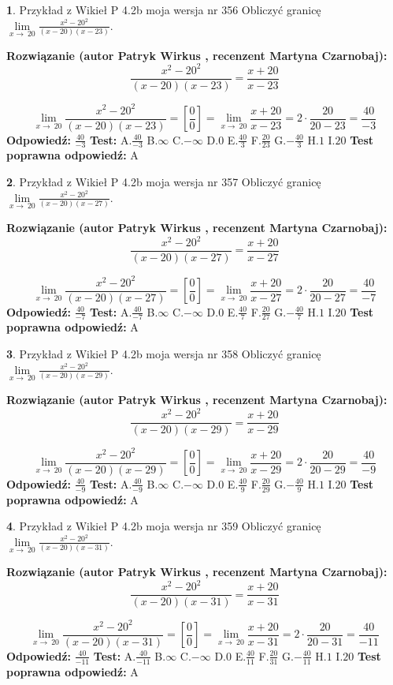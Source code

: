 \documentclass[12pt, a4paper]{article}
\theoremstyle{definition} %
\newtheorem{zad}{}
\newcommand{\zadStart}[1]{\begin{zad}#1\newline}
\newcommand{\zadStop}{\end{zad}}
\newcommand{\rozwStart}[2]{\noindent \textbf{Rozwiązanie (autor #1 , recenzent #2): }\newline}
\newcommand{\rozwStop}{\newline}
\newcommand{\odpStart}{\noindent \textbf{Odpowiedź:}\newline}
\newcommand{\odpStop}{\newline}
\newcommand{\testStart}{\noindent \textbf{Test:}\newline}
\newcommand{\testStop}{\newline}
\newcommand{\kluczStart}{\noindent \textbf{Test poprawna odpowiedź:}\newline}
\newcommand{\kluczStop}{\newline}
\begin{document}
\zadStart{Przykład z Wikieł P 4.2b moja wersja nr 356}
Obliczyć granicę $\lim\limits_{x\to\ 20}\frac{x^{2}-20^{2}}{(x-20)(x-23)}$.
\zadStop
\rozwStart{Patryk Wirkus}{Martyna Czarnobaj}
$$\frac{x^{2}-20^{2}}{(x-20)(x-23)}=\frac{x+20}{x-23}$$

$$\lim\limits_{x\to\ 20}\frac{x^{2}-20^{2}}{(x-20)(x-23)}=[\frac{0}{0}]=\lim\limits_{x\to\ 20}\frac{x+20}{x-23}=2 \cdot \frac{20}{20-23} = \frac{40}{-3}$$
\rozwStop
\odpStart
$\frac{40}{-3}$
\odpStop
\testStart
A.$\frac{40}{-3}$
B.$\infty$
C.$-\infty$
D.$0$
E.$\frac{40}{3}$
F.$\frac{20}{23}$
G.$-\frac{40}{3}$
H.$1$
I.$20$
\testStop
\kluczStart
A
\kluczStop



\zadStart{Przykład z Wikieł P 4.2b moja wersja nr 357}
Obliczyć granicę $\lim\limits_{x\to\ 20}\frac{x^{2}-20^{2}}{(x-20)(x-27)}$.
\zadStop
\rozwStart{Patryk Wirkus}{Martyna Czarnobaj}
$$\frac{x^{2}-20^{2}}{(x-20)(x-27)}=\frac{x+20}{x-27}$$

$$\lim\limits_{x\to\ 20}\frac{x^{2}-20^{2}}{(x-20)(x-27)}=[\frac{0}{0}]=\lim\limits_{x\to\ 20}\frac{x+20}{x-27}=2 \cdot \frac{20}{20-27} = \frac{40}{-7}$$
\rozwStop
\odpStart
$\frac{40}{-7}$
\odpStop
\testStart
A.$\frac{40}{-7}$
B.$\infty$
C.$-\infty$
D.$0$
E.$\frac{40}{7}$
F.$\frac{20}{27}$
G.$-\frac{40}{7}$
H.$1$
I.$20$
\testStop
\kluczStart
A
\kluczStop



\zadStart{Przykład z Wikieł P 4.2b moja wersja nr 358}
Obliczyć granicę $\lim\limits_{x\to\ 20}\frac{x^{2}-20^{2}}{(x-20)(x-29)}$.
\zadStop
\rozwStart{Patryk Wirkus}{Martyna Czarnobaj}
$$\frac{x^{2}-20^{2}}{(x-20)(x-29)}=\frac{x+20}{x-29}$$

$$\lim\limits_{x\to\ 20}\frac{x^{2}-20^{2}}{(x-20)(x-29)}=[\frac{0}{0}]=\lim\limits_{x\to\ 20}\frac{x+20}{x-29}=2 \cdot \frac{20}{20-29} = \frac{40}{-9}$$
\rozwStop
\odpStart
$\frac{40}{-9}$
\odpStop
\testStart
A.$\frac{40}{-9}$
B.$\infty$
C.$-\infty$
D.$0$
E.$\frac{40}{9}$
F.$\frac{20}{29}$
G.$-\frac{40}{9}$
H.$1$
I.$20$
\testStop
\kluczStart
A
\kluczStop



\zadStart{Przykład z Wikieł P 4.2b moja wersja nr 359}
Obliczyć granicę $\lim\limits_{x\to\ 20}\frac{x^{2}-20^{2}}{(x-20)(x-31)}$.
\zadStop
\rozwStart{Patryk Wirkus}{Martyna Czarnobaj}
$$\frac{x^{2}-20^{2}}{(x-20)(x-31)}=\frac{x+20}{x-31}$$

$$\lim\limits_{x\to\ 20}\frac{x^{2}-20^{2}}{(x-20)(x-31)}=[\frac{0}{0}]=\lim\limits_{x\to\ 20}\frac{x+20}{x-31}=2 \cdot \frac{20}{20-31} = \frac{40}{-11}$$
\rozwStop
\odpStart
$\frac{40}{-11}$
\odpStop
\testStart
A.$\frac{40}{-11}$
B.$\infty$
C.$-\infty$
D.$0$
E.$\frac{40}{11}$
F.$\frac{20}{31}$
G.$-\frac{40}{11}$
H.$1$
I.$20$
\testStop
\kluczStart
A
\kluczStop
\end{document}
